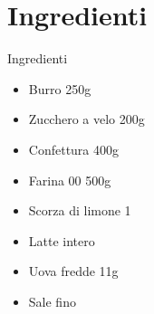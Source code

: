 \section{Ingredienti}
\begin{frame}{Ingredienti}
  \transblindshorizontal
    \begin{itemize}
      \item Burro 250g
      \item Zucchero a velo 200g
      \item Confettura 400g
      \item Farina 00 500g
      \item Scorza di limone 1
      \item Latte intero 
      \item Uova fredde 11g
      \item Sale fino
    \end{itemize}	
\end{frame}

